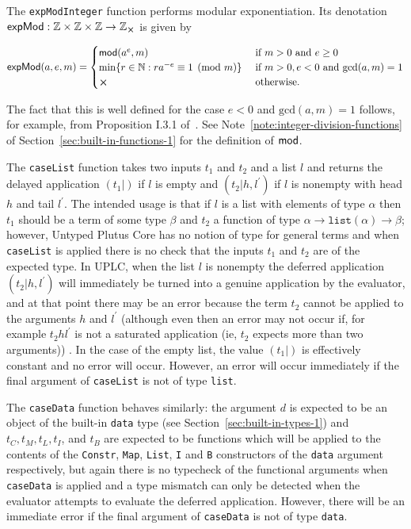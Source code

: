 \label{note:exp-mod-integer}
The \texttt{expModInteger} function performs modular exponentiation.  Its denotation
$\mathsf{expMod}: \Z \times \Z \times \Z \rightarrow \Z_{\errorX}$ is given by

$$
\mathsf{expMod}(a,e,m) =
  \begin{cases}
     \modfn(a^e,m) & \text{if $m > 0$ and $e \geq 0$}\\
     \min\{r \in \N: ra^{-e} \equiv 1\pmod{m}\}\  & \text{if $m > 0, e < 0$ and $\mathrm{gcd}(a,m) = 1$}\\
     \errorX & \text{otherwise.}
  \end{cases}
$$ 

\noindent The fact that this is well defined for the case $e<0$ and $\mathrm{gcd}(a,m) = 1$
follows, for example, from Proposition I.3.1 of~\cite{Koblitz-GTM}.  See
Note~\ref{note:integer-division-functions} of
Section~\ref{sec:built-in-functions-1} for the definition of $\operatorname{\mathsf{mod}}$.

\label{note:case-list-case-data}
The \texttt{caseList} function takes two inputs $t_1$ and $t_2$ and a list $l$
and returns the delayed application $(t_1|)$ if $l$ is empty and
$(t_2|h,l^{\prime})$ if $l$ is nonempty with head $h$ and tail $l^{\prime}$.
The intended usage is that if $l$ is a list with elements of type $\alpha$ then
$t_1$ should be a term of some type $\beta$ and $t_2$ a function of type
$\alpha \rightarrow
\mathtt{list}(\alpha) \rightarrow \beta$; however, Untyped Plutus Core has no notion
of type for general terms and when \texttt{caseList} is applied there is no
check that the inputs $t_1$ and $t_2$ are of the expected type.  In UPLC, when
the list $l$ is nonempty the deferred application $(t_2|h,l^{\prime})$ will
immediately be turned into a genuine application by the evaluator, and at that
point there may be an error because the term $t_2$ cannot be applied to the
arguments $h$ and $l^{\prime}$ (although even then an error may not occur if,
for example $t_2 h l^{\prime}$ is not a saturated application (ie, $t_2$ expects
more than two arguments)) .  In the case of the empty list, the value $(t_1|)$
is effectively constant and no error will occur.  However, an error will occur
immediately if the final argument of \texttt{caseList} is not of
type \texttt{list}.

The \texttt{caseData} function behaves similarly: the argument $d$ is expected
to be an object of the built-in \texttt{data} type (see
Section~\ref{sec:built-in-types-1}) and $t_C, t_M, t_L, t_I$, and $t_B$ are
expected to be functions which will be applied to the contents of
the \texttt{Constr}, \texttt{Map}, \texttt{List}, \texttt{I} and \texttt{B}
constructors of the \texttt{data} argument respectively, but again there is no
typecheck of the functional arguments when \texttt{caseData} is applied and a
type mismatch can only be detected when the evaluator attempts to evaluate the
deferred application.  However, there will be an immediate error if the final
argument of \texttt{caseData} is not of type \texttt{data}.



